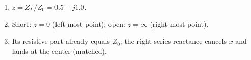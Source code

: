 \begin{enumerate}[leftmargin=1.6em,itemsep=2pt]
\item $z = Z_L/Z_0 = 0.5 - j1.0$.
\item Short: $z = 0$ (left-most point); open: $z = \infty$ (right-most point).
\item Its resistive part already equals $Z_0$; the right series reactance cancels $x$ and lands at the center (matched).
\end{enumerate}
